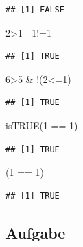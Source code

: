 \documentclass[
]{book}
\newenvironment{Shaded}{\begin{snugshade}}{\end{snugshade}}
\newcommand{\DecValTok}[1]{\textcolor[rgb]{0.00,0.00,0.81}{#1}}
\newcommand{\FunctionTok}[1]{\textcolor[rgb]{0.00,0.00,0.00}{#1}}
\newcommand{\NormalTok}[1]{#1}
\newcommand{\SpecialCharTok}[1]{\textcolor[rgb]{0.00,0.00,0.00}{#1}}
\begin{document}
\begin{verbatim}
## [1] FALSE
\end{verbatim}

\begin{Shaded}
\begin{Highlighting}[]
\DecValTok{2}\SpecialCharTok{\textgreater{}}\DecValTok{1} \SpecialCharTok{|} \DecValTok{1}\SpecialCharTok{!=}\DecValTok{1}
\end{Highlighting}
\end{Shaded}

\begin{verbatim}
## [1] TRUE
\end{verbatim}

\begin{Shaded}
\begin{Highlighting}[]
\DecValTok{6}\SpecialCharTok{\textgreater{}}\DecValTok{5} \SpecialCharTok{\&} \SpecialCharTok{!}\NormalTok{(}\DecValTok{2}\SpecialCharTok{\textless{}=}\DecValTok{1}\NormalTok{)}
\end{Highlighting}
\end{Shaded}

\begin{verbatim}
## [1] TRUE
\end{verbatim}

\begin{Shaded}
\begin{Highlighting}[]
\FunctionTok{isTRUE}\NormalTok{(}\DecValTok{1} \SpecialCharTok{==} \DecValTok{1}\NormalTok{)}
\end{Highlighting}
\end{Shaded}

\begin{verbatim}
## [1] TRUE
\end{verbatim}

\begin{Shaded}
\begin{Highlighting}[]
\NormalTok{(}\DecValTok{1} \SpecialCharTok{==} \DecValTok{1}\NormalTok{)}
\end{Highlighting}
\end{Shaded}

\begin{verbatim}
## [1] TRUE
\end{verbatim}

\hypertarget{aufgabe-1}{%
\subsection*{Aufgabe}\label{aufgabe-1}}
\end{document}
